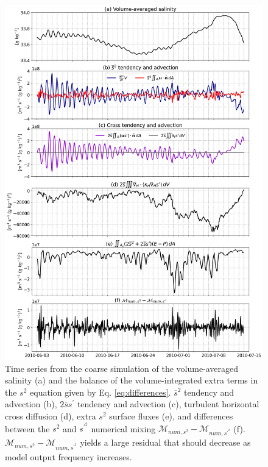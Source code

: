 \begin{figure}
 \centerline{\includegraphics[width = 0.85\linewidth]{figures/james_2023/Figure8_extra_terms.jpg}}
  \caption{Time series from the coarse simulation of the volume-averaged salinity (a) and the balance of the volume-integrated extra terms in the $s^2$ equation given by Eq. \ref{eq:differences}. $\overline{s}^2$ tendency and advection (b), $2 \overline{s} s^\prime$ tendency and advection (c), turbulent horizontal cross diffusion (d), extra $s^2$ surface fluxes (e), and differences between the $s^2$ and $s^{\prime^2}$ numerical mixing $\mathcal{M}_{num, s^2}-\mathcal{M}_{num, s^{\prime^2}}$ (f). $\mathcal{M}_{num, s^2}-\mathcal{M}_{num, s^{\prime^2}}$ yields a large residual that should decrease as model output frequency increases.}
  \label{fig:s2_extra_terms}
\end{figure}

